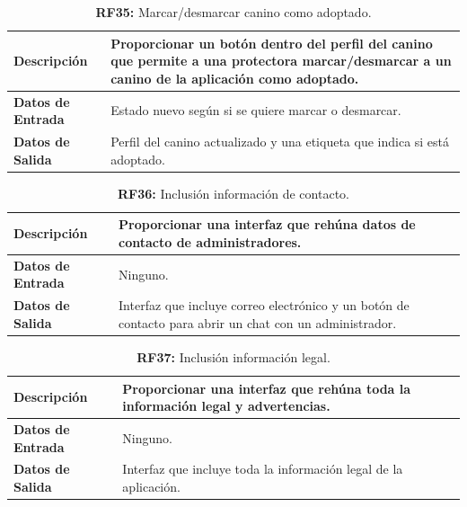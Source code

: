 \documentclass[a4paper, 12pt]{article}
\begin{document}
\begin{table}[H]
\captionsetup{list=no}%
\captionsetup{justification=raggedright,singlelinecheck=false}
\captionsetup{labelformat=empty}
\caption{\textbf{RF35:} Marcar/desmarcar canino como adoptado.}
\label{tab:RF35}
	\begin{tabular}{|m{5cm}|m{10cm}|}
	\hline
	\textbf{Descripción} & Proporcionar un botón dentro del perfil del canino que permite a una protectora marcar/desmarcar a un canino de la aplicación como adoptado. \\ 
	\hline
	\textbf{Datos de Entrada} & Estado nuevo según si se quiere marcar o desmarcar. \\ 
	\hline
	\textbf{Datos de Salida} & Perfil del canino actualizado y una etiqueta que indica si está adoptado. \\ 
	\hline
\end{tabular}
\end{table}


\begin{table}[H]
\captionsetup{list=no}%
\captionsetup{justification=raggedright,singlelinecheck=false}
\captionsetup{labelformat=empty}
\caption{\textbf{RF36:} Inclusión información de contacto.}
\label{tab:RF36}
	\begin{tabular}{|m{5cm}|m{10cm}|}
	\hline
	\textbf{Descripción} & Proporcionar una interfaz que rehúna datos de contacto de administradores. \\ 
	\hline
	\textbf{Datos de Entrada} & Ninguno. \\ 
	\hline
	\textbf{Datos de Salida} & Interfaz que incluye correo electrónico y un botón de contacto para abrir un chat con un administrador. \\ 
	\hline
\end{tabular}
\end{table}

\begin{table}[H]
\captionsetup{list=no}%
\captionsetup{justification=raggedright,singlelinecheck=false}
\captionsetup{labelformat=empty}
\caption{\textbf{RF37:} Inclusión información legal.}
\label{tab:RF37}
	\begin{tabular}{|m{5cm}|m{10cm}|}
	\hline
	\textbf{Descripción} & Proporcionar una interfaz que rehúna toda la información legal y advertencias. \\ 
	\hline
	\textbf{Datos de Entrada} & Ninguno. \\ 
	\hline
	\textbf{Datos de Salida} & Interfaz que incluye toda la información legal de la aplicación. \\ 
	\hline
\end{tabular}
\end{table}
\end{document}
